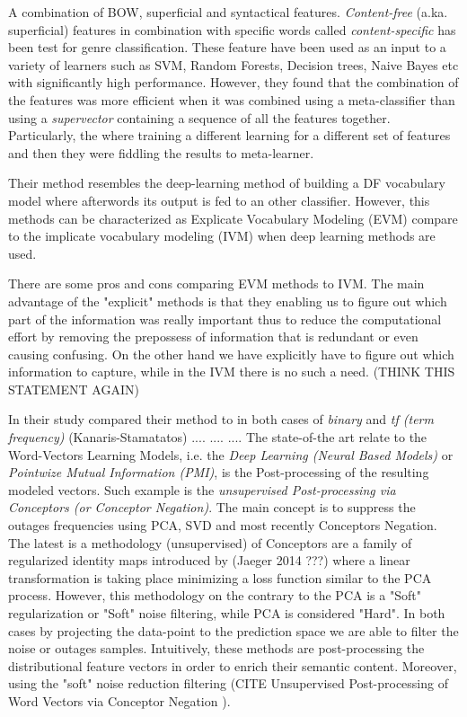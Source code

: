 A combination of BOW, superficial and syntactical features. \textit{Content-free} (a.ka. superficial) features in combination with specific words called \textit{content-specific} has been test for genre classification. These feature have been used as an input to a variety of learners such as SVM, Random Forests, Decision trees, Naive Bayes etc with significantly high performance. However, they found that the combination of the features was more efficient when it was combined using a meta-classifier than using a \textit{supervector} containing a sequence of all the features together. Particularly, the where training a different learning for a different set of features and then they were fiddling the results to meta-learner\parencite{lee2017text}.

Their method resembles the deep-learning method of building a DF vocabulary model where afterwords its output is fed to an other classifier. However, this methods can be characterized as Explicate Vocabulary Modeling (EVM) compare to the implicate vocabulary modeling (IVM) when deep learning methods are used.

There are some pros and cons comparing EVM methods to IVM. The main advantage of the "explicit" methods is that they enabling us to figure out which part of the information was really important thus to reduce the computational effort by removing the prepossess of information that is redundant or even causing confusing. On the other hand we have explicitly have to figure out which information to capture, while in the IVM there is no such a need. (THINK THIS STATEMENT AGAIN)

In their study compared their method to in both cases of \textit{binary} and \textit{tf (term frequency)} (Kanaris-Stamatatos)
....
....
....
The state-of-the art relate to the Word-Vectors Learning Models, i.e. the \textit{Deep Learning (Neural Based Models)} or \textit{Pointwize Mutual Information (PMI)}, is the Post-processing of the resulting modeled vectors. Such example is the \textit{unsupervised Post-processing via Conceptors (or Conceptor Negation)}. The main concept is to suppress the outages frequencies using PCA, SVD and most recently Conceptors Negation. The latest is a methodology (unsupervised) of Conceptors are a family of regularized identity maps introduced by (Jaeger 2014 ???) where a linear transformation is taking place minimizing a loss function similar to the PCA process. However, this methodology on the contrary to the PCA is a "Soft" regularization or "Soft" noise filtering, while PCA is considered "Hard". In both cases by projecting the data-point to the prediction space we are able to filter the noise or outages samples. Intuitively, these methods are post-processing the distributional feature vectors in order to enrich their semantic content. Moreover, using the "soft" noise reduction filtering (CITE Unsupervised Post-processing of Word Vectors via Conceptor Negation ).

